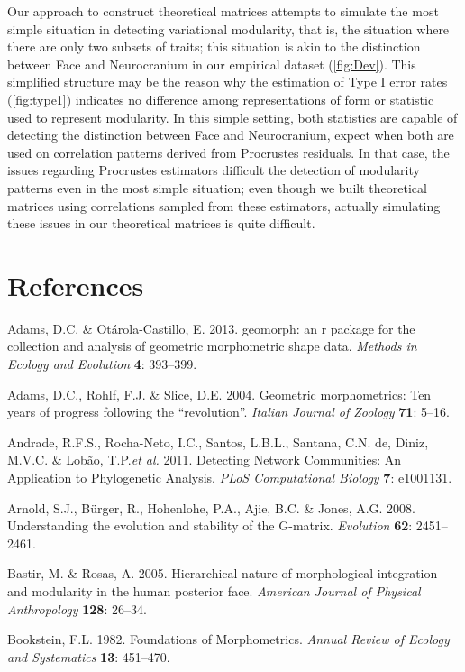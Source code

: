 \documentclass[12pt,]{article}
\begin{document}
Our approach to construct theoretical matrices attempts to simulate the
most simple situation in detecting variational modularity, that is, the
situation where there are only two subsets of traits; this situation is
akin to the distinction between Face and Neurocranium in our empirical
dataset (\autoref{fig:Dev}). This simplified structure may be the reason
why the estimation of Type I error rates (\autoref{fig:type1}) indicates
no difference among representations of form or statistic used to
represent modularity. In this simple setting, both statistics are
capable of detecting the distinction between Face and Neurocranium,
expect when both are used on correlation patterns derived from
Procrustes residuals. In that case, the issues regarding Procrustes
estimators difficult the detection of modularity patterns even in the
most simple situation; even though we built theoretical matrices using
correlations sampled from these estimators, actually simulating these
issues in our theoretical matrices is quite difficult.

\section*{References}\label{references}

Adams, D.C. \& Otárola-Castillo, E. 2013. geomorph: an r package for the
collection and analysis of geometric morphometric shape data.
\emph{Methods in Ecology and Evolution} \textbf{4}: 393--399.

Adams, D.C., Rohlf, F.J. \& Slice, D.E. 2004. Geometric morphometrics:
Ten years of progress following the ``revolution''. \emph{Italian
Journal of Zoology} \textbf{71}: 5--16.

Andrade, R.F.S., Rocha-Neto, I.C., Santos, L.B.L., Santana, C.N. de,
Diniz, M.V.C. \& Lobão, T.P.\emph{et al.} 2011. Detecting Network
Communities: An Application to Phylogenetic Analysis. \emph{PLoS
Computational Biology} \textbf{7}: e1001131.

Arnold, S.J., Bürger, R., Hohenlohe, P.A., Ajie, B.C. \& Jones, A.G.
2008. Understanding the evolution and stability of the G-matrix.
\emph{Evolution} \textbf{62}: 2451--2461.

Bastir, M. \& Rosas, A. 2005. Hierarchical nature of morphological
integration and modularity in the human posterior face. \emph{American
Journal of Physical Anthropology} \textbf{128}: 26--34.

Bookstein, F.L. 1982. Foundations of Morphometrics. \emph{Annual Review
of Ecology and Systematics} \textbf{13}: 451--470.
\end{document}
